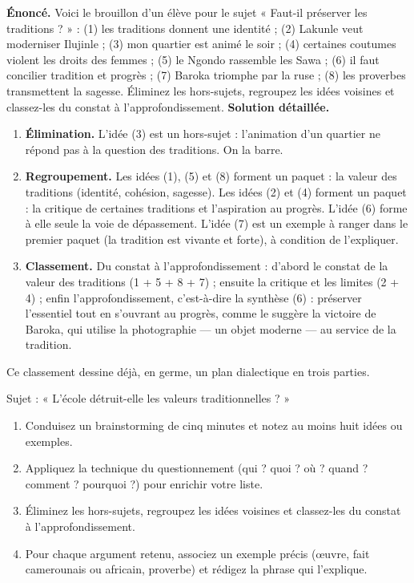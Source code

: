 \documentclass[11pt]{article}
\begin{document}
\begin{exoresolu}
\textbf{Énoncé.} Voici le brouillon d'un élève pour le sujet « Faut-il préserver les traditions ? » : (1) les traditions donnent une identité ; (2) Lakunle veut moderniser Ilujinle ; (3) mon quartier est animé le soir ; (4) certaines coutumes violent les droits des femmes ; (5) le Ngondo rassemble les Sawa ; (6) il faut concilier tradition et progrès ; (7) Baroka triomphe par la ruse ; (8) les proverbes transmettent la sagesse. Éliminez les hors-sujets, regroupez les idées voisines et classez-les du constat à l'approfondissement.
\tcblower
\textbf{Solution détaillée.}
\begin{enumerate}
\item \textbf{Élimination.} L'idée (3) est un hors-sujet : l'animation d'un quartier ne répond pas à la question des traditions. On la barre.
\item \textbf{Regroupement.} Les idées (1), (5) et (8) forment un paquet : la valeur des traditions (identité, cohésion, sagesse). Les idées (2) et (4) forment un paquet : la critique de certaines traditions et l'aspiration au progrès. L'idée (6) forme à elle seule la voie de dépassement. L'idée (7) est un exemple à ranger dans le premier paquet (la tradition est vivante et forte), à condition de l'expliquer.
\item \textbf{Classement.} Du constat à l'approfondissement : d'abord le constat de la valeur des traditions (1 + 5 + 8 + 7) ; ensuite la critique et les limites (2 + 4) ; enfin l'approfondissement, c'est-à-dire la synthèse (6) : préserver l'essentiel tout en s'ouvrant au progrès, comme le suggère la victoire de Baroka, qui utilise la photographie — un objet moderne — au service de la tradition.
\end{enumerate}
Ce classement dessine déjà, en germe, un plan dialectique en trois parties.
\end{exoresolu}

\begin{exercice}
Sujet : « L'école détruit-elle les valeurs traditionnelles ? »
\begin{enumerate}
\item Conduisez un brainstorming de cinq minutes et notez au moins huit idées ou exemples.
\item Appliquez la technique du questionnement (qui ? quoi ? où ? quand ? comment ? pourquoi ?) pour enrichir votre liste.
\item Éliminez les hors-sujets, regroupez les idées voisines et classez-les du constat à l'approfondissement.
\item Pour chaque argument retenu, associez un exemple précis (œuvre, fait camerounais ou africain, proverbe) et rédigez la phrase qui l'explique.
\end{enumerate}
\end{exercice}
\end{document}
